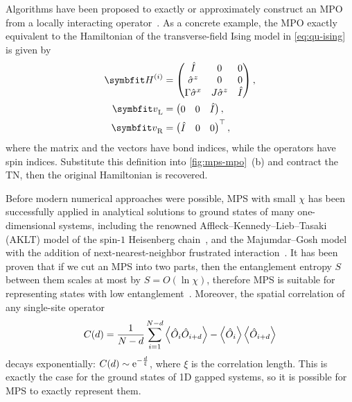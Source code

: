 Algorithms have been proposed to exactly or approximately construct an MPO from a locally interacting operator~\cite{crosswhite2008finite, hubig2017generic, paeckel2017automated}. As a concrete example, the MPO exactly equivalent to the Hamiltonian of the transverse-field Ising model in \cref{eq:qu-ising} is given by
\begin{align}
\mH^{(i)} &= \begin{pmatrix}
\hat{I} & 0 & 0 \\
\hat{\sigma}^z & 0 & 0 \\
\Gamma \hat{\sigma}^x & J \hat{\sigma}^z & \hat{I}
\end{pmatrix}, \\
\vv_\text{L} &= \begin{pmatrix} 0 & 0 & \hat{I} \end{pmatrix}, \\
\vv_\text{R} &= \begin{pmatrix} \hat{I} & 0 & 0 \end{pmatrix}^\transpose,
\end{align}
where the matrix and the vectors have bond indices, while the operators have spin indices. Substitute this definition into \cref{fig:mps-mpo}~(b) and contract the TN, then the original Hamiltonian is recovered.

Before modern numerical approaches were possible, MPS with small $\chi$ has been successfully applied in analytical solutions to ground states of many one-dimensional systems, including the renowned Affleck--Kennedy--Lieb--Tasaki (AKLT) model of the spin-$1$ Heisenberg chain~\cite{affleck1987rigorous, klumper1991equivalence, fannes1992finitely}, and the Majumdar--Gosh model with the addition of next-nearest-neighbor frustrated interaction~\cite{majumdar1969next}. It has been proven that if we cut an MPS into two parts, then the entanglement entropy $S$ between them scales at most by $S = O(\ln \chi)$, therefore MPS is suitable for representing states with low entanglement~\cite{verstraete2008matrix}. Moreover, the spatial correlation of any single-site operator
\begin{equation}
C(d) = \frac{1}{N - d} \sum_{i = 1}^{N - d} \ev{\hat{O}_i \hat{O}_{i + d}} - \ev{\hat{O}_i} \ev{\hat{O}_{i + d}}
\label{eq:corr-d}
\end{equation}
decays exponentially: $C(d) \sim \mathrm{e}^{-\frac{d}{\xi}}$, where $\xi$ is the correlation length. This is exactly the case for the ground states of 1D gapped systems, so it is possible for MPS to exactly represent them.

